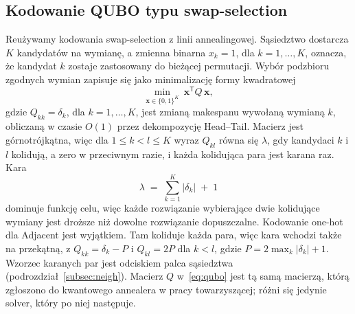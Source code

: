 \documentclass[11pt,a4paper]{article}
\begin{document}
\subsection{Kodowanie QUBO typu swap-selection}
\label{subsec:qubo}
Reużywamy kodowania swap-selection z linii annealingowej. Sąsiedztwo dostarcza $K$
kandydatów na wymianę, a zmienna binarna $x_k=1$, dla $k=1,\dots,K$, oznacza,
że kandydat $k$ zostaje zastosowany do bieżącej permutacji. Wybór podzbioru zgodnych wymian zapisuje się jako minimalizację
formy kwadratowej
\begin{equation}
  \min_{\mathbf{x}\in\{0,1\}^{K}}\
  \mathbf{x}^{\mathsf T} Q\,\mathbf{x},
  \label{eq:qubo}
\end{equation}
gdzie $Q_{kk}=\delta_k$, dla $k=1,\dots,K$, jest zmianą makespanu wywołaną
wymianą $k$, obliczaną w czasie $O(1)$ przez dekompozycję Head--Tail. Macierz
jest górnotrójkątna, więc dla $1\le k<l\le K$ wyraz $Q_{kl}$ równa się
$\lambda$, gdy kandydaci $k$ i $l$ kolidują, a zero w przeciwnym razie,
i każda kolidująca para jest karana raz. Kara
\begin{equation}
  \lambda \;=\; \sum_{k=1}^{K}\lvert\delta_k\rvert \;+\; 1
  \label{eq:penalty}
\end{equation}
dominuje funkcję celu, więc każde rozwiązanie wybierające dwie kolidujące
wymiany jest droższe niż dowolne rozwiązanie dopuszczalne. Kodowanie one-hot
dla Adjacent jest wyjątkiem. Tam koliduje każda para, więc kara wchodzi także
na przekątną, z $Q_{kk}=\delta_k-P$ i $Q_{kl}=2P$ dla $k<l$, gdzie
$P=2\max_{k}\lvert\delta_k\rvert+1$. Wzorzec karanych
par jest odciskiem palca sąsiedztwa (podrozdział~\ref{subsec:neigh}). Macierz
$Q$ w~\eqref{eq:qubo} jest tą samą macierzą, którą zgłoszono do kwantowego
annealera w pracy towarzyszącej; różni się jedynie solver, który po niej
następuje.
\end{document}
